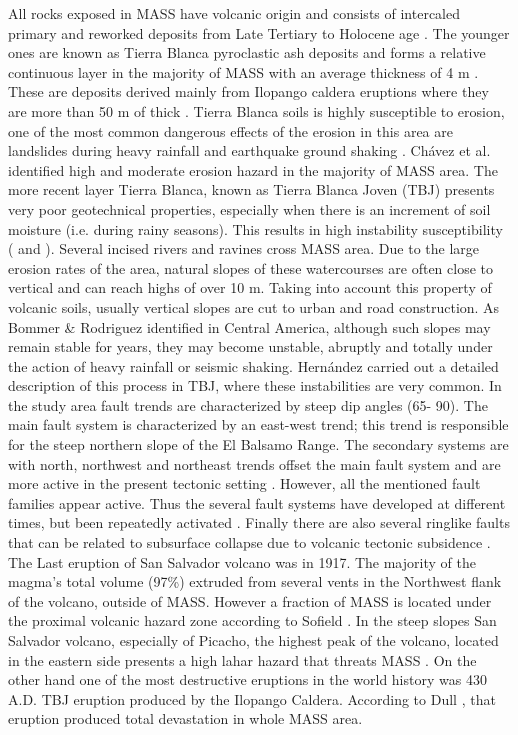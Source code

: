 \documentclass[11pt,twoside]{rmta2010eng}%
\begin{document}
All rocks exposed in MASS have volcanic origin and consists of intercaled primary and reworked deposits from Late Tertiary to Holocene age \cite{schmidt1975}. The younger ones are known as Tierra Blanca pyroclastic ash deposits and forms a relative continuous layer in the majority of MASS with an average thickness of 4 m \cite{schmidt1975}. These are deposits derived mainly from Ilopango caldera eruptions where they are more than 50 m of thick \cite{schmidt1975}. Tierra Blanca soils is highly susceptible to erosion, one of the most common dangerous effects of the erosion in this area are landslides during heavy rainfall and earthquake ground shaking \cite{schmidt1975}. Ch\'{a}vez et al. \cite{chavez2014a} identified high and moderate erosion hazard in the majority of MASS area. The more recent layer Tierra Blanca, known as Tierra Blanca Joven (TBJ) \cite{hernan2004} presents very poor geotechnical properties, especially when there is an increment of soil moisture (i.e. during rainy seasons). This results in high instability susceptibility (\cite{chavez2014b} and \cite{rolo2004}). Several incised rivers and ravines cross MASS area. Due to the large erosion rates of the area, natural slopes of these watercourses are often close to vertical and can reach highs of over 10 m. Taking into account this property of volcanic soils, usually vertical slopes are cut to urban and road construction. As Bommer \& Rodriguez \cite{bommer} identified in Central America, although such slopes may remain stable for years, they may become unstable, abruptly and totally under the action of heavy rainfall or seismic shaking. Hern\'{a}ndez \cite{hernan2004} carried out a detailed description of this process in TBJ, where these instabilities are very common. 
In the study area fault trends are characterized by steep dip angles (65\textdegree - 90\textdegree). The main fault system is characterized by an east-west trend; this trend is responsible for the steep northern slope of the El Balsamo Range.  The secondary systems are with north, northwest and northeast trends offset the main fault system and are more active in the present tectonic setting \cite{schmidt1975}. However, all the mentioned fault families appear active. Thus the several fault systems have developed at different times, but been repeatedly activated \cite{rymer1987}. Finally there are also several ringlike faults that can be related to subsurface collapse due to volcanic tectonic subsidence \cite{schmidt1975}. The Last eruption of San Salvador volcano was in 1917.  The majority of the magma's total volume (97\%) extruded from several vents in the Northwest flank of the volcano, outside of MASS. However a fraction of MASS is located under the proximal volcanic hazard zone according to Sofield \cite{sofield2004}. In the steep slopes  San Salvador volcano, especially of Picacho, the highest peak of the volcano, located in the eastern side presents a high lahar hazard that threats MASS \cite{major2004}. On the other hand one of the most destructive eruptions in the world history was 430 A.D. TBJ eruption produced by the Ilopango Caldera. According to Dull \cite{dull2004}, that eruption produced total devastation in whole MASS area. 
\end{document}
